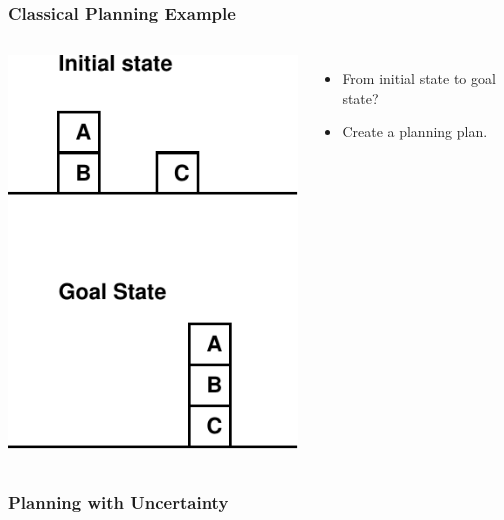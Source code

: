 \documentclass{beamer}
\let\origframetitle=\frametitle
\renewcommand\frametitle[1]{\origframetitle{\textbf{\large{\textrm{#1}}}}}
\begin{document}
\begin{frame}
  \frametitle{Classical Planning Example}

  \begin{columns}
    \includegraphics[width=\textwidth]{../presentation-plan/blocksworld.pdf}


    \begin{itemize}
      \item From initial state to goal state?
      \item Create a planning plan.
    \end{itemize}

  \end{columns}

\end{frame}

\begin{frame}
  \frametitle{Planning with Uncertainty}
\end{frame}
\end{document}
